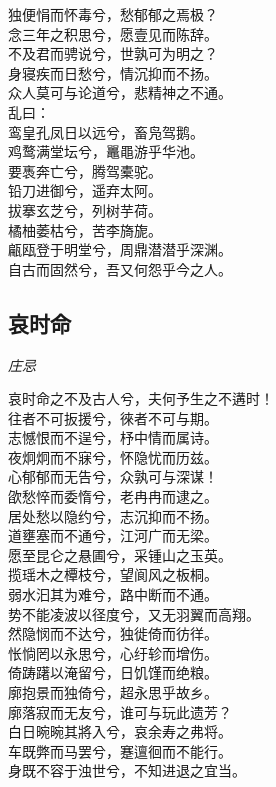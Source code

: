 \documentclass[]{article}
\begin{document}
独便悁而怀毒兮，愁郁郁之焉极？\\
念三年之积思兮，愿壹见而陈辞。\\
不及君而骋说兮，世孰可为明之？\\
身寝疾而日愁兮，情沉抑而不扬。\\
众人莫可与论道兮，悲精神之不通。\\
乱曰：\\
鸾皇孔凤日以远兮，畜凫驾鹅。\\
鸡鹜满堂坛兮，鼉黽游乎华池。\\
要褭奔亡兮，腾驾橐驼。\\
铅刀进御兮，遥弃太阿。\\
拔搴玄芝兮，列树芋荷。\\
橘柚萎枯兮，苦李旖旎。\\
甂瓯登于明堂兮，周鼎潜潜乎深渊。\\
自古而固然兮，吾又何怨乎今之人。

\hypertarget{header-n3020}{%
\subsection{哀时命}\label{header-n3020}}

\emph{庄忌}

哀时命之不及古人兮，夫何予生之不遘时！\\
往者不可扳援兮，徠者不可与期。\\
志憾恨而不逞兮，杼中情而属诗。\\
夜炯炯而不寐兮，怀隐忧而历兹。\\
心郁郁而无告兮，众孰可与深谋！\\
欿愁悴而委惰兮，老冉冉而逮之。\\
居处愁以隐约兮，志沉抑而不扬。\\
道壅塞而不通兮，江河广而无梁。\\
愿至昆仑之悬圃兮，采锺山之玉英。\\
揽瑶木之橝枝兮，望阆风之板桐。\\
弱水汩其为难兮，路中断而不通。\\
势不能凌波以径度兮，又无羽翼而高翔。\\
然隐悯而不达兮，独徙倚而彷徉。\\
怅惝罔以永思兮，心纡轸而增伤。\\
倚踌躇以淹留兮，日饥馑而绝粮。\\
廓抱景而独倚兮，超永思乎故乡。\\
廓落寂而无友兮，谁可与玩此遗芳？\\
白日晼晼其將入兮，哀余寿之弗将。\\
车既弊而马罢兮，蹇邅徊而不能行。\\
身既不容于浊世兮，不知进退之宜当。
\end{document}
